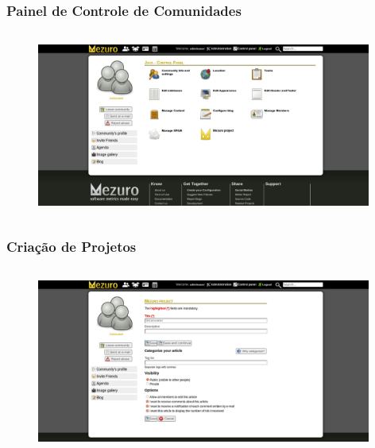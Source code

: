 \documentclass{beamer}
\begin{document}
    \begin{frame}
      \frametitle{Painel de Controle de Comunidades}
      \framesubtitle{}
    
      \begin{figure}
        \begin{center}
          \includegraphics[width=11cm, height=6cm]{images/04-community-control-panel.png}
          \label{fig:community-control-panel}
        \end{center}
      \end{figure}
    \end{frame}
    
    \begin{frame}
      \frametitle{Criação de Projetos}
      \framesubtitle{}
    
      \begin{figure}
        \begin{center}
          \includegraphics[width=11cm, height=6cm]{images/05-project-creation.png}
          \label{fig:project-creation}
        \end{center}
      \end{figure}
    \end{frame}
    
\end{document}
